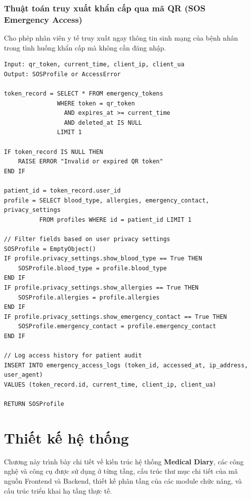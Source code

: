 \documentclass[12pt,a4paper]{report}
\begin{document}
\subsection{Thuật toán truy xuất khẩn cấp qua mã QR (SOS Emergency Access)}
Cho phép nhân viên y tế truy xuất ngay thông tin sinh mạng của bệnh nhân trong tình huống khẩn cấp mà không cần đăng nhập.

\begin{lstlisting}[caption={Thuật toán Truy xuất khẩn cấp}, label={alg:sos}, basicstyle=\small\ttfamily, frame=single]
Input: qr_token, current_time, client_ip, client_ua
Output: SOSProfile or AccessError

token_record = SELECT * FROM emergency_tokens
               WHERE token = qr_token
                 AND expires_at >= current_time
                 AND deleted_at IS NULL
               LIMIT 1

IF token_record IS NULL THEN
    RAISE ERROR "Invalid or expired QR token"
END IF

patient_id = token_record.user_id
profile = SELECT blood_type, allergies, emergency_contact, privacy_settings 
          FROM profiles WHERE id = patient_id LIMIT 1

// Filter fields based on user privacy settings
SOSProfile = EmptyObject()
IF profile.privacy_settings.show_blood_type == True THEN
    SOSProfile.blood_type = profile.blood_type
END IF
IF profile.privacy_settings.show_allergies == True THEN
    SOSProfile.allergies = profile.allergies
END IF
IF profile.privacy_settings.show_emergency_contact == True THEN
    SOSProfile.emergency_contact = profile.emergency_contact
END IF

// Log access history for patient audit
INSERT INTO emergency_access_logs (token_id, accessed_at, ip_address, user_agent)
VALUES (token_record.id, current_time, client_ip, client_ua)

RETURN SOSProfile
\end{lstlisting}

\chapter{Thiết kế hệ thống}

Chương này trình bày chi tiết về kiến trúc hệ thống \textbf{Medical Diary}, các công nghệ và công cụ được sử dụng ở từng tầng, cấu trúc thư mục chi tiết của mã nguồn Frontend và Backend, thiết kế phân tầng của các module chức năng, và cấu trúc triển khai hạ tầng thực tế.
\end{document}
